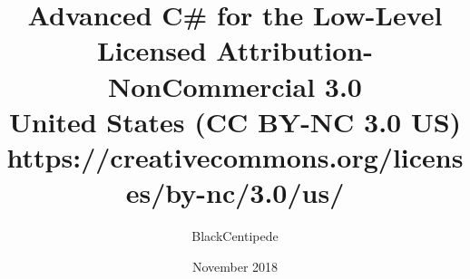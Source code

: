 \documentclass{book}
\begin{document}
\author{BlackCentipede}
\title{Advanced C\# for the Low-Level\\
	   \large Licensed Attribution-NonCommercial 3.0 
	   \\United States (CC BY-NC 3.0 US) \\
   	   \small https://creativecommons.org/licenses/by-nc/3.0/us/}
\date{November 2018}

\frontmatter

\maketitle
\newpage

\tableofcontents

\mainmatter





\backmatter
\end{document}
